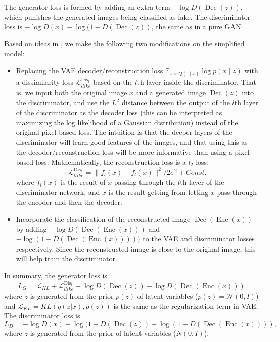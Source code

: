 \documentclass[10pt]{article}
\newcommand{\op}[1]{\operatorname{#1}}
\renewcommand{\tilde}[1]{\widetilde{#1}}
\begin{document}
The generator loss is formed by adding an extra term $-\log D(\op{Dec}(z))$, which punishes the generated images being classified as fake. The discriminator loss is $-\log D(x) - \log (1-D(\op{Dec}(z))$, the same as in a pure GAN.

Based on ideas in \cite{larsen2015autoencoding}, we make the following two modifications on the simplified model:
\begin{itemize}
\item Replacing the VAE decoder/reconstruction loss $\mathbb{E}_{z \sim Q(\cdot \mid x)} \log p(x \mid z)$ with a dissimilarity loss $\mathcal{L}_{llike}^{\op{Dis}_l}$ based on the $l$th layer inside the discriminator. That is, we input both the original image $x$ and a generated image $\op{Dec}(z)$ into the discriminator, and use the $L^2$ distance between the output of the $l$th layer of the discriminator as the decoder loss (this can be interpreted as maximizing the log likelihood of a Gaussian distribution) instead of the original pixel-based loss. The intuition is that the deeper layers of the discriminator will learn good features of the images, and that using this as the decoder/reconstruction loss will be more informative than using a pixel-based loss. Mathematically, the reconstruction loss is a $l_2$ loss:
$$
\mathcal{L}_{llike}^{\op{Dis}_l} = \|f_l(x) - f_l(\tilde{x})\|^2 / 2\sigma^2 +Const.
$$
where $f_l(x)$ is the result of $x$ passing through the $l$th layer of the discriminator network, and $\tilde x$ is the result getting from letting $x$ pass through the encoder and then the decoder.

\item Incorporate the classification of the reconstructed image $\op{Dec}(\op{Enc}(x))$ by adding $-\log D(\op{Dec}(\op{Enc}(x)))$ and $-\log (1-D(\op{Dec}(\op{Enc}(x)))))$ to the VAE and discriminator losses respectively. Since the reconstructed image is close to the original image, this will help train the discriminator.
\end{itemize}

In summary, the generator loss is
\begin{equation}\label{vaegan1}
L_G = \mathcal{L}_{KL} + \mathcal{L}_{llike}^{\op{Dis}_l} -\log D(\op{Dec}(z)) -\log D(\op{Dec}(\op{Enc}(x)))
\end{equation}
where $z$ is generated from the prior $p(z)$ of latent variables ($p(z) = \mathcal{N}(0,I)$) and $\mathcal{L}_{KL} = KL(q(z|x),p(z))$ is the same as the regularization term in VAE.
The discriminator loss is
\begin{equation}\label{vaegan2}
L_D = -\log D(x) - \log (1-D(\op{Dec}(z)) -\log (1-D(\op{Dec}(\op{Enc}(x)))),
\end{equation}
where $z$ is generated from the prior of latent variables ($N(0,I)$).
\end{document}
